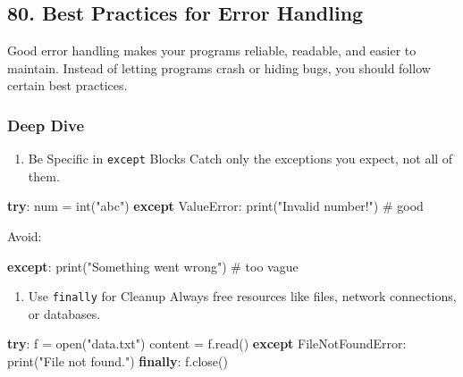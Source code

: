 \documentclass[
  letterpaper,
  DIV=11,
  numbers=noendperiod]{scrreprt}
\newenvironment{Shaded}{\begin{snugshade}}{\end{snugshade}}
\newcommand{\BuiltInTok}[1]{\textcolor[rgb]{0.00,0.23,0.31}{#1}}
\newcommand{\CommentTok}[1]{\textcolor[rgb]{0.37,0.37,0.37}{#1}}
\newcommand{\ControlFlowTok}[1]{\textcolor[rgb]{0.00,0.23,0.31}{\textbf{#1}}}
\newcommand{\NormalTok}[1]{\textcolor[rgb]{0.00,0.23,0.31}{#1}}
\newcommand{\OperatorTok}[1]{\textcolor[rgb]{0.37,0.37,0.37}{#1}}
\newcommand{\PreprocessorTok}[1]{\textcolor[rgb]{0.68,0.00,0.00}{#1}}
\newcommand{\StringTok}[1]{\textcolor[rgb]{0.13,0.47,0.30}{#1}}
\providecommand{\tightlist}{%
  \setlength{\itemsep}{0pt}\setlength{\parskip}{0pt}}
\begin{document}
\subsection{80. Best Practices for Error
Handling}\label{best-practices-for-error-handling}

Good error handling makes your programs reliable, readable, and easier
to maintain. Instead of letting programs crash or hiding bugs, you
should follow certain best practices.

\subsubsection{Deep Dive}\label{deep-dive-79}

\begin{enumerate}
\def\labelenumi{\arabic{enumi}.}
\tightlist
\item
  Be Specific in \texttt{except} Blocks Catch only the exceptions you
  expect, not all of them.
\end{enumerate}

\begin{Shaded}
\begin{Highlighting}[]
\ControlFlowTok{try}\NormalTok{:}
\NormalTok{    num }\OperatorTok{=} \BuiltInTok{int}\NormalTok{(}\StringTok{"abc"}\NormalTok{)}
\ControlFlowTok{except} \PreprocessorTok{ValueError}\NormalTok{:}
    \BuiltInTok{print}\NormalTok{(}\StringTok{"Invalid number!"}\NormalTok{)   }\CommentTok{\# good}
\end{Highlighting}
\end{Shaded}

Avoid:

\begin{Shaded}
\begin{Highlighting}[]
\ControlFlowTok{except}\NormalTok{:}
    \BuiltInTok{print}\NormalTok{(}\StringTok{"Something went wrong"}\NormalTok{)   }\CommentTok{\# too vague}
\end{Highlighting}
\end{Shaded}

\begin{enumerate}
\def\labelenumi{\arabic{enumi}.}
\setcounter{enumi}{1}
\tightlist
\item
  Use \texttt{finally} for Cleanup Always free resources like files,
  network connections, or databases.
\end{enumerate}

\begin{Shaded}
\begin{Highlighting}[]
\ControlFlowTok{try}\NormalTok{:}
\NormalTok{    f }\OperatorTok{=} \BuiltInTok{open}\NormalTok{(}\StringTok{"data.txt"}\NormalTok{)}
\NormalTok{    content }\OperatorTok{=}\NormalTok{ f.read()}
\ControlFlowTok{except} \PreprocessorTok{FileNotFoundError}\NormalTok{:}
    \BuiltInTok{print}\NormalTok{(}\StringTok{"File not found."}\NormalTok{)}
\ControlFlowTok{finally}\NormalTok{:}
\NormalTok{    f.close()}
\end{Highlighting}
\end{Shaded}
\end{document}
